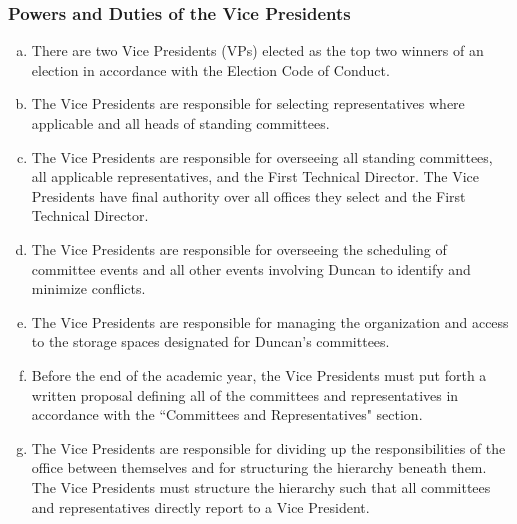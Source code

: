 \documentclass[USletter,12pt]{article}
\begin{document}
\begin{enumerate}[(a)]
\subsubsection{Powers and Duties of the Vice Presidents}
\begin{enumerate}[(a)]
\item There are two Vice Presidents (VPs) elected as the top two winners of an election in accordance with the Election Code of Conduct.
\item The Vice Presidents are responsible for selecting representatives where applicable and all heads of standing committees.
\item The Vice Presidents are responsible for overseeing all standing committees, all applicable representatives, and the First Technical Director.  The Vice Presidents have final authority over all offices they select and the First Technical Director.
\item The Vice Presidents are responsible for overseeing the scheduling of committee events and all other events involving Duncan to identify and minimize conflicts.
\item The Vice Presidents are responsible for managing the organization and access to the storage spaces designated for Duncan's committees.
\item Before the end of the academic year, the Vice Presidents must put forth a written proposal defining all of the committees and representatives in accordance with the ``Committees and Representatives" section.
\item The Vice Presidents are responsible for dividing up the responsibilities of the office between themselves and for structuring the hierarchy beneath them.  The Vice Presidents must structure the hierarchy such that all committees and representatives directly report to a Vice President.
\end{enumerate}


\end{enumerate}
\end{document}
